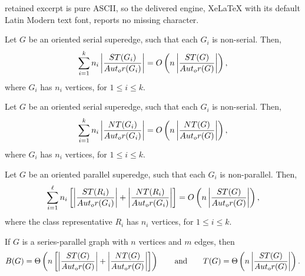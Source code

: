 \documentclass[10pt,a4paper]{amsart}
\begin{document}
retained excerpt is pure ASCII, so the delivered engine, XeLaTeX with its default Latin Modern text font, reports no missing character.
\begin{lemma}
    \label{seriallemma1}
    Let $G$ be an oriented serial superedge, such that each $G_i$ is non-serial. Then,
    \[\sum_{i = 1}^k n_i\left\vert \frac{\emph{\textsf{ST}}(G_i)}{\emph{Aut}_\emph{or}(G_i)}\right\vert = O\left(n\left\vert \frac{\emph{\textsf{ST}}(G)}{\emph{Aut}_\emph{or}(G)}\right\vert \right),\]
    where $G_i$ has $n_i$ vertices, for $1 \leq i \leq k$.
\end{lemma}

\begin{lemma}
    \label{seriallemma2}
    Let $G$ be an oriented serial superedge, such that each $G_i$ is non-serial. Then,
    \[\sum_{i = 1}^k n_i\left\vert \frac{\emph{\textsf{NT}}(G_i)}{\emph{Aut}_\emph{or}(G_i)}\right\vert = O\left(n\left\vert \frac{\emph{\textsf{NT}}(G)}{\emph{Aut}_\emph{or}(G)}\right\vert \right),\]
    where $G_i$ has $n_i$ vertices, for $1 \leq i \leq k$.
\end{lemma}

\begin{lemma}
    \label{parallellemma}
    Let $G$ be an oriented parallel superedge, such that each $G_i$ is non-parallel. Then,
    \[\sum_{i = 1}^\ell n_i\left[\left\vert \frac{\emph{\textsf{ST}}(R_i)}{\emph{Aut}_\emph{or}(G_i)}\right\vert + \left\vert \frac{\emph{\textsf{NT}}(R_i)}{\emph{Aut}_\emph{or}(G_i)}\right\vert\right] = O\left(n\left\vert \frac{\emph{\textsf{ST}}(G)}{\emph{Aut}_\emph{or}(G)}\right\vert\right),\]
    where the class representative $R_i$ has $n_i$ vertices, for $1 \leq i \leq k$. 
\end{lemma}

\begin{theorem}
    \label{runtime}
    If $G$ is a series-parallel graph with $n$ vertices and $m$ edges, then \[B(G) = \Theta\left(n\left[\left\vert \frac{\emph{\textsf{ST}}(G)}{\emph{Aut}_\emph{or}(G)}\right\vert + \left\vert \frac{\emph{\textsf{NT}}(G)}{\emph{Aut}_\emph{or}(G)}\right\vert\right]\right) \qquad\text{and}\qquad T(G) = \Theta\left(n\left\vert \frac{\emph{\textsf{ST}}(G)}{\emph{Aut}_\emph{or}(G)}\right\vert\right).\]
\end{theorem}
\end{document}
